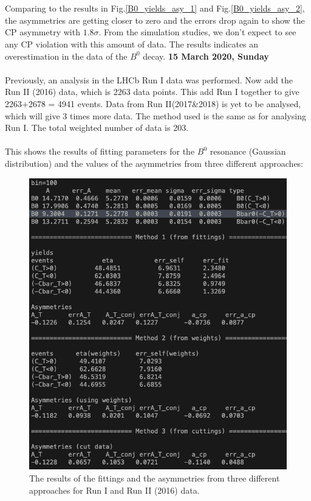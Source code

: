 \\
\\
Comparing to the results in Fig.\ref{B0_yields_asy_1} and Fig.\ref{B0_yields_asy_2}, the asymmetries are getting closer to zero and the errors drop again to show the CP asymmetry with $1.8\sigma$. From the simulation studies, we don't expect to see any CP violation with this amount of data. The results indicates an overestimation in the data of the $B^0$ decay. 
\clearpage
\noindent\textbf{15 March 2020, Sunday}
\\
\\
Previously, an analysis in the LHCb Run I data was performed. Now add the Run II (2016) data, which is 2263 data points. This add Run I together to give 2263+2678 = 4941 events. Data from Run II(2017\&2018) is yet to be analysed, which will give 3 times more data. The method used is the same as for analysing Run I. The total weighted number of data is 203.
\\
\\
This shows the results of fitting parameters for the $B^0$ resonance (Gaussian distribution) and the values of the asymmetries from three different approaches:
\begin{figure}[h]
\center
\includegraphics*[width=0.76\linewidth]{LHCb_Run1_AND_2/B0_yields_asy_old}
\caption{The results of the fittings and the asymmetries from three different approaches for Run I and Run II (2016) data.}
\label{B0_yields_asy_old_run12}
\end{figure}
\\
